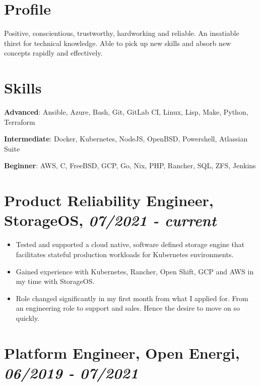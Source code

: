 \documentclass[letterpaper]{article}
\author{Toby Slight}
\date{\today}
\title{}
\begin{document}

\section{Profile}
\label{sec:org4763103}

Positive, conscientious, trustworthy, hardworking and reliable. An insatiable
thirst for technical knowledge. Able to pick up new skills and absorb new
concepts rapidly and effectively.

\section{Skills}
\label{sec:orgac47f62}

\textbf{Advanced}: Ansible, Azure, Bash, Git, GitLab CI, Linux, Lisp, Make, Python, Terraform

\textbf{Intermediate}: Docker, Kubernetes, NodeJS, OpenBSD, Powershell, Atlassian Suite

\textbf{Beginner}: AWS, C, FreeBSD, GCP, Go, Nix, PHP, Rancher, SQL, ZFS, Jenkins

\section{Product Reliability Engineer, StorageOS, \emph{07/2021 - current}}
\label{sec:org879732c}

\begin{itemize}
\item Tested and supported a cloud native, software defined storage engine that
facilitates stateful production workloads for Kubernetes environments.

\item Gained experience with Kubernetes, Rancher, Open Shift, GCP and AWS in
my time with StorageOS.

\item Role changed significantly in my first month from what I applied for. From an
engineering role to support and sales. Hence the desire to move on so
quickly.
\end{itemize}

\section{Platform Engineer, Open Energi, \emph{06/2019 - 07/2021}}
\label{sec:org4edf51e}
\end{document}
